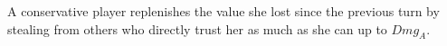 {}
\begin{definition}
  A conservative player replenishes the value she lost since the previous turn by stealing from others who directly trust her
  as much as she can up to $Dmg_A$.
\end{definition}
